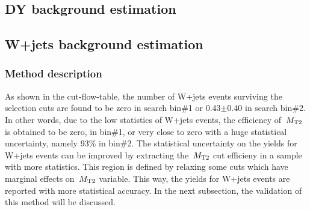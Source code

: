 \subsection{DY background estimation}
\subsection{W+jets background estimation}
\subsubsection{Method description}
As shown in the cut-flow-table, the number of W+jets events surviving the selection cuts are found to be zero in search bin\#1 or 0.43$\pm$0.40 in search bin\#2. In other words, due to the low statistics of W+jets events, the efficiency of $\,{M_{\rm T2}}$ is obtained to be zero, in bin\#1, or very close to zero with a huge statistical uncertainty, namely 93\% in bin\#2. The statistical uncertainty on the yields for W+jets events can be improved by extracting the $\,{M_{\rm T2}}$ cut efficieny in a sample with more statistics. This region is defined by relaxing some cuts which have marginal effects on $\,{M_{\rm T2}}$ variable. This way, the yields for W+jets events are reported with more statistical accuracy. In the next subsection, the validation of this method will be discussed.\\

